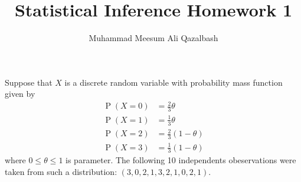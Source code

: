 \documentclass[addpoints]{exam}
\title{Statistical Inference Homework 1}
\author{Muhammad Meesum Ali Qazalbash}
\theoremstyle{mytheoremstyle}
\theoremstyle{mytheoremstyle}
\theoremstyle{myproblemstyle}
\begin{document}
\maketitle

\begin{questions}
	\question Suppose that \(X\) is a discrete random variable with probability mass function given by
	\begin{align*}
		\operatorname{P}(X=0) & =\frac{2}{3}\theta     \\
		\operatorname{P}(X=1) & =\frac{1}{3}\theta     \\
		\operatorname{P}(X=2) & =\frac{2}{3}(1-\theta) \\
		\operatorname{P}(X=3) & =\frac{1}{3}(1-\theta)
	\end{align*}
	where \(0\leq\theta\leq1\) is parameter. The following 10 independents obeservations were taken from such a distribution: \((3, 0, 2, 1, 3, 2, 1, 0, 2, 1)\).

\end{questions}
\end{document}
